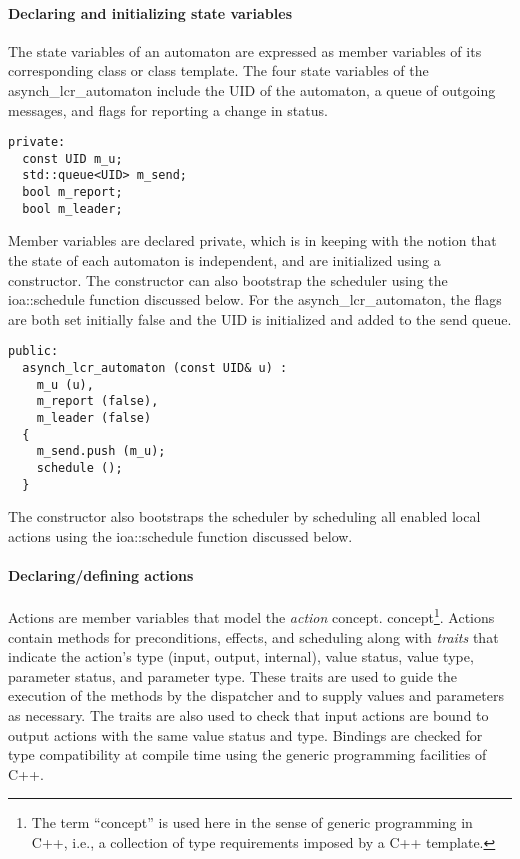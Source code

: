 \paragraph*{Declaring and initializing state variables}
\fi
The state variables of an automaton are expressed as member variables of its corresponding class or class template.
\ifjournal
The four state variables of the asynch\_lcr\_automaton include the UID of the automaton, a queue of outgoing messages, and flags for reporting a change in status.
\begin{lstlisting}
private:
  const UID m_u;
  std::queue<UID> m_send;
  bool m_report;
  bool m_leader;
\end{lstlisting}
\fi
Member variables are declared private, which is in keeping with the notion that the state of each automaton is independent, and are initialized using a constructor.
The constructor can also bootstrap the scheduler using the ioa::schedule function discussed below.
\ifjournal
For the asynch\_lcr\_automaton, the flags are both set initially false and the UID is initialized and added to the send queue.
\begin{lstlisting}
public:
  asynch_lcr_automaton (const UID& u) :
    m_u (u),
    m_report (false),
    m_leader (false)
  {
    m_send.push (m_u);
    schedule ();
  }
\end{lstlisting}
The constructor also bootstraps the scheduler by scheduling all enabled local actions using the ioa::schedule function discussed below.
\fi

\paragraph*{Declaring/defining actions}
Actions are member variables that model the \emph{action} 
\ifjournal
concept.
\else
concept\footnote{The term ``concept'' is used here in the sense of generic programming in C++, i.e., a collection of type requirements imposed by a C++ template.}.
\fi
Actions contain methods for preconditions, effects, and scheduling along with \emph{traits} that indicate the action's type (input, output, internal), value status, value type, parameter status, and parameter type.
These traits are used to guide the execution of the methods by the dispatcher and to supply values and parameters as necessary.
The traits are also used to check that input actions are bound to output actions with the same value status and type.
Bindings are checked for type compatibility at compile time using the generic programming facilities of C++.


